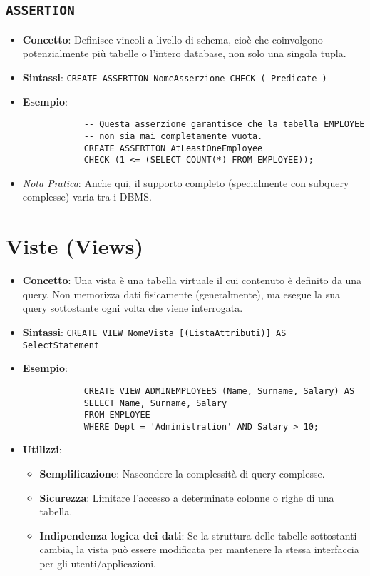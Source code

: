 \documentclass{article}
\begin{document}
	\subsection{\texttt{ASSERTION}}
	\begin{itemize}
		\item \textbf{Concetto}: Definisce vincoli a livello di schema, cioè che coinvolgono potenzialmente più tabelle o l'intero database, non solo una singola tupla.
		\item \textbf{Sintassi}: \texttt{CREATE ASSERTION NomeAsserzione CHECK ( Predicate )}
		\item \textbf{Esempio}:
		\begin{verbatim}
			-- Questa asserzione garantisce che la tabella EMPLOYEE
			-- non sia mai completamente vuota.
			CREATE ASSERTION AtLeastOneEmployee
			CHECK (1 <= (SELECT COUNT(*) FROM EMPLOYEE));
		\end{verbatim}
		\item \textit{Nota Pratica}: Anche qui, il supporto completo (specialmente con subquery complesse) varia tra i DBMS.
	\end{itemize}
	
	\section{Viste (Views)}
	\begin{itemize}
		\item \textbf{Concetto}: Una vista è una tabella virtuale il cui contenuto è definito da una query. Non memorizza dati fisicamente (generalmente), ma esegue la sua query sottostante ogni volta che viene interrogata.
		\item \textbf{Sintassi}: \texttt{CREATE VIEW NomeVista [(ListaAttributi)] AS SelectStatement}
		\item \textbf{Esempio}:
		\begin{verbatim}
			CREATE VIEW ADMINEMPLOYEES (Name, Surname, Salary) AS
			SELECT Name, Surname, Salary
			FROM EMPLOYEE
			WHERE Dept = 'Administration' AND Salary > 10;
		\end{verbatim}
		\item \textbf{Utilizzi}:
		\begin{itemize}
			\item \textbf{Semplificazione}: Nascondere la complessità di query complesse.
			\item \textbf{Sicurezza}: Limitare l'accesso a determinate colonne o righe di una tabella.
			\item \textbf{Indipendenza logica dei dati}: Se la struttura delle tabelle sottostanti cambia, la vista può essere modificata per mantenere la stessa interfaccia per gli utenti/applicazioni.
		\end{itemize}
	\end{itemize}
	
\end{document}
